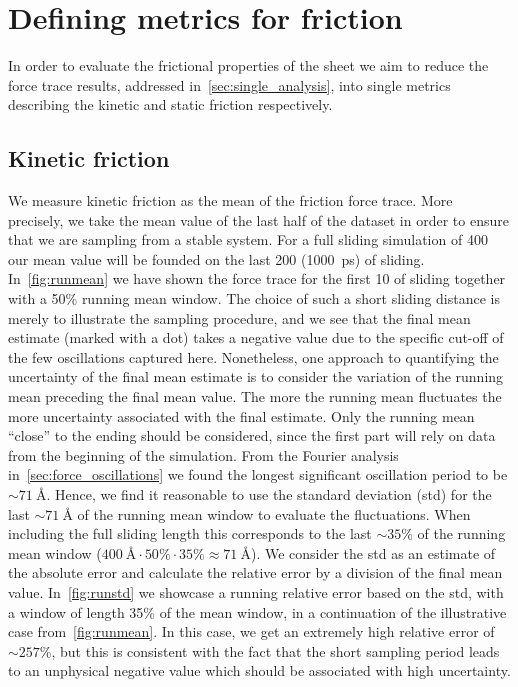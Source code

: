 \section{Defining metrics for friction}\label{sec:fric_metrics}
In order to evaluate the frictional properties of the sheet we aim to reduce the force trace results, addressed in~\cref{sec:single_analysis}, into single metrics describing the kinetic and static friction respectively. 

\subsection{Kinetic friction}
We measure kinetic friction as the mean of the friction force trace. More
precisely, we take the mean value of the last half of the dataset in order to
ensure that we are sampling from a stable system. For a full sliding simulation
of \SI{400}{} our mean value will be founded on the last
\SI{200}{} (\SI{1000}{ps}) of sliding. In~\cref{fig:runmean} we have
shown the force trace for the first \SI{10}{} of sliding together with a
50\% running mean window. The choice of such a short sliding distance is merely
to illustrate the sampling procedure, and we see that the final mean estimate
(marked with a dot) takes a negative value due to the specific cut-off of the
few oscillations captured here. Nonetheless, one approach to quantifying the
uncertainty of the final mean estimate is to consider the variation of the
running mean preceding the final mean value. The more the running mean
fluctuates the more uncertainty associated with the final estimate. Only the
running mean ``close'' to the ending should be considered, since the first part
will rely on data from the beginning of the simulation. From the Fourier analysis
in~\cref{sec:force_oscillations} we found the longest significant
oscillation period to be $\sim \SI{71}{\text{Å}}$. Hence, we find it reasonable
to use the standard deviation (\acrshort{std}) for the last $\sim
\SI{71}{\text{Å}}$ of the running mean window to evaluate the fluctuations. When
including the full sliding length this corresponds to the last $\sim 35 \%$ of
the running mean window ($\SI{400}{\text{Å}}\cdot 50\% \cdot 35\% \approx \SI{71}{\text{Å}}$). We consider the \acrshort{std} as an estimate of the
absolute error and calculate the relative error by a division of the final mean
value. In~\cref{fig:runstd} we showcase a running relative error based on the
\acrshort{std}, with a window of length 35\% of the mean window, in a continuation
of the illustrative case from~\cref{fig:runmean}.
In this case, we get an extremely high relative error of $\sim 257\%$, but this
is consistent with the fact that the short sampling period leads to an
unphysical negative value which should be associated with high uncertainty. 

